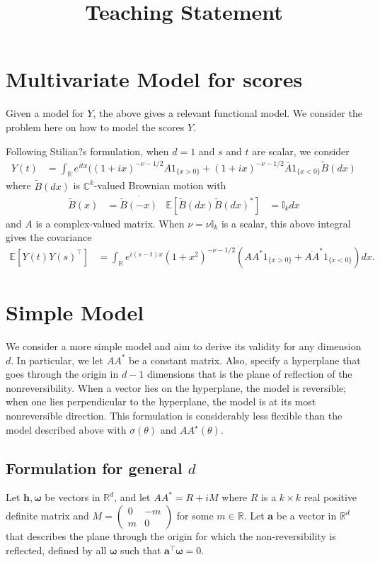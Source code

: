 \documentclass[11pt]{article}
\title{Teaching Statement}
\author{}
\newcommand{\vlen}{\boldsymbol{h}}
\newcommand{\vint}{\boldsymbol{\omega}}
\newcommand{\vpla}{\boldsymbol{a}}
\begin{document}
\section{Multivariate Model for scores}

Given a model for $Y$, the above gives a relevant functional model. We consider the problem here on how to model the scores $Y$. 

Following Stilian?s formulation, when $d=1$ and $s$ and $t$ are scalar, we consider \begin{align*}
Y(t) &= \int_\mathbb{R}e^{itx}((1 + ix)^{-\nu - 1/2} A1_{\{x > 0\}} + (1 + ix)^{-\nu - 1/2} \overline{A}1_{\{x < 0\}}\tilde{B} (dx)
\end{align*}where $\tilde{B}(dx)$ is $\mathbb{C}^k$-valued Brownian motion with \begin{align*}
\tilde{B}(x) &= \overline{\tilde{B}(-x)} &  \mathbb{E}[\tilde{B}(dx) \tilde{B}(dx)^*] &= \mathbb{I}_k dx
\end{align*}and $A$ is a complex-valued matrix. When $\nu = \nu \mathbb{I}_k$ is a scalar, this above integral gives the covariance \begin{align*}
\mathbb{E}[ Y(t) Y(s)^\top ] &= \int_{\mathbb{R}} e^{i(s-t)x}(1+x^2)^{-\nu-1/2}(AA^*1_{\{x >0\}} + \overline{AA}^*1_{\{x < 0\}})dx.
\end{align*}

\section{Simple Model}

We consider a more simple model and aim to derive its validity for any dimension $d$. In particular, we let $AA^*$ be a constant matrix. Also, specify a hyperplane that goes through the origin in $d-1$ dimensions that is the plane of reflection of the nonreversibility. When a vector lies on the hyperplane, the model is reversible; when one lies perpendicular to the hyperplane, the model is at its most nonreversible direction. This formulation is considerably less flexible than the model described above with $\sigma(\theta)$ and $AA^\star(\theta)$.

\subsection{Formulation for general $d$}

Let $ \vlen, \vint$ be vectors in $\mathbb{R}^d$, and let $AA^* = R + iM$ where $R$ is a $k\times k$ real positive definite matrix and $M = \begin{pmatrix} 0 & -m\\  m & 0\end{pmatrix}$ for some $m \in \mathbb{R}$. Let $\vpla$ be a vector in $\mathbb{R}^d$ that describes the plane through the origin for which the non-reversibility is reflected, defined by all $\vint$ such that $\vpla^\top \vint = 0$.
\end{document}
